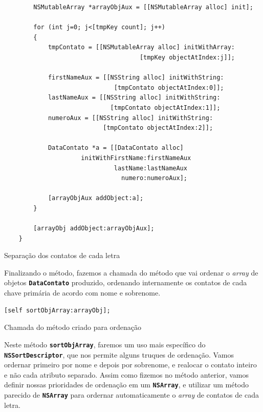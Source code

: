 \documentclass[a4paper,12pt,brazil,doubleside]{book}
\begin{document}
\begin{singlespace}
\begin{listing}[H]
\begin{verbatim}
        NSMutableArray *arrayObjAux = [[NSMutableArray alloc] init];
        
        for (int j=0; j<[tmpKey count]; j++)
        {
            tmpContato = [[NSMutableArray alloc] initWithArray:
                                     [tmpKey objectAtIndex:j]];

            firstNameAux = [[NSString alloc] initWithString:
                              [tmpContato objectAtIndex:0]];
            lastNameAux = [[NSString alloc] initWithString:
                             [tmpContato objectAtIndex:1]];
            numeroAux = [[NSString alloc] initWithString:
                           [tmpContato objectAtIndex:2]];
            
            DataContato *a = [[DataContato alloc] 
                     initWithFirstName:firstNameAux
                              lastName:lastNameAux
                                numero:numeroAux];
            
            [arrayObjAux addObject:a];            
        }
        
        [arrayObj addObject:arrayObjAux];
    }
\end{verbatim}
\caption{Separação dos contatos de cada letra}
\end{listing}


Finalizando o método, fazemos a chamada do método que vai ordenar o \emph{array} de objetos \texttt{\textbf{DataContato}} produzido, ordenando internamente os contatos de cada chave primária de acordo com nome e sobrenome.

\begin{listing}[H]
\begin{verbatim}
[self sortObjArray:arrayObj];
\end{verbatim}
\caption{Chamada do método criado para ordenação}
\end{listing}


Neste método \texttt{\textbf{sortObjArray}}, faremos um uso mais específico do \texttt{\textbf{NSSortDescriptor}}, que nos permite alguns truques de ordenação. Vamos ordernar primeiro por nome e depois por sobrenome, e realocar o contato inteiro e não cada atributo separado. Assim como fizemos no método anterior, vamos definir nossas prioridades de ordenação em um \texttt{\textbf{NSArray}}, e utilizar um método parecido de \texttt{\textbf{NSArray}} para ordernar automaticamente o \emph{array} de contatos de cada letra.\\


\end{singlespace}
\end{document}
